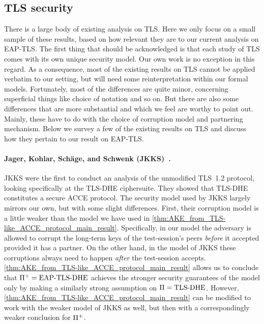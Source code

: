\subsection{TLS security}\label{sec:EAP-TLS-security:application:TLS-security}


There is a large body of existing analysis on TLS.
Here we only focus on a small sample of these results,
based on how relevant they are to our current analysis on  EAP-TLS.
The first thing that should be acknowledged is that each study of TLS comes with its own unique security model.
Our own work is no exception in this regard.
As a consequence,
most of the existing results on TLS cannot be applied verbatim to our setting,
but will need some reinterpretation within our formal models.
Fortunately,
most of the differences are quite minor,
concerning superficial things like choice of notation and so on.
But there are also some differences that are more substantial
and which we feel are worthy to point out.
Mainly,
these have to do with the choice of corruption model
and 
partnering mechanism.
Below we survey a few of the existing results on TLS and discuss how they pertain to our result on EAP-TLS.


\paragraph{Jager, Kohlar, Schäge, and Schwenk (JKKS)~\texorpdfstring{\cite{C:JKSS12}}{}.} 
JKKS were the first to conduct an analysis of the unmodified TLS~1.2 protocol,
looking specifically at the TLS-DHE ciphersuite.
They showed that TLS-DHE constitutes a secure ACCE protocol. 
The security model used by JKKS largely mirrors our own,
but with some slight differences.
First,
their corruption model is a little weaker than the 
\akefstext model we have used in \cref{thm:AKE_from_TLS-like_ACCE_protocol_main_result}.
Specifically,
in our  \akefstext model the adversary is allowed to corrupt the long-term keys of the test-session's peers \emph{before} it accepted provided it has a partner.
On the other hand,
in the model of JKKS these corruptions always need to happen \emph{after} the test-session accepts.
\cref{thm:AKE_from_TLS-like_ACCE_protocol_main_result} allows us to conclude that $\mathrm{\Pi}^{+} = \operatorname{EAP-TLS-DHE}$ achieves the stronger security guarantees of the \akefstext model only by making a similarly strong assumption on $\mathrm{\Pi} = \operatorname{TLS-DHE}$.
However,
\cref{thm:AKE_from_TLS-like_ACCE_protocol_main_result} can be modified to work with the weaker model of JKKS as well,
but then with a correspondingly weaker conclusion for $\mathrm{\Pi}^{+}$.

